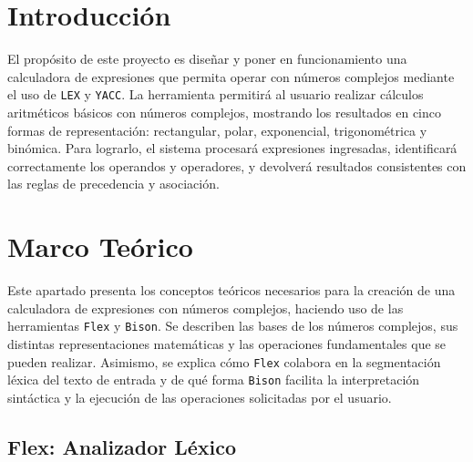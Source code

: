 \documentclass{article}
\begin{document}


\section{Introducción}\label{sec:intr}

El propósito de este proyecto es diseñar y poner en funcionamiento una calculadora de expresiones que permita operar con números complejos mediante el uso de \texttt{LEX} y \texttt{YACC}. La herramienta permitirá al usuario realizar cálculos aritméticos básicos con números complejos, mostrando los resultados en cinco formas de representación: rectangular, polar, exponencial, trigonométrica y binómica. Para lograrlo, el sistema procesará expresiones ingresadas, identificará correctamente los operandos y operadores, y devolverá resultados consistentes con las reglas de precedencia y asociación.


\section{Marco Teórico}\label{sec:marc}

Este apartado presenta los conceptos teóricos necesarios para la creación de una calculadora de expresiones con números complejos, haciendo uso de las herramientas \texttt{Flex} y \texttt{Bison}. Se describen las bases de los números complejos, sus distintas representaciones matemáticas y las operaciones fundamentales que se pueden realizar. Asimismo, se explica cómo \texttt{Flex} colabora en la segmentación léxica del texto de entrada y de qué forma \texttt{Bison} facilita la interpretación sintáctica y la ejecución de las operaciones solicitadas por el usuario.

\subsection*{Flex: Analizador Léxico}
\end{document}
